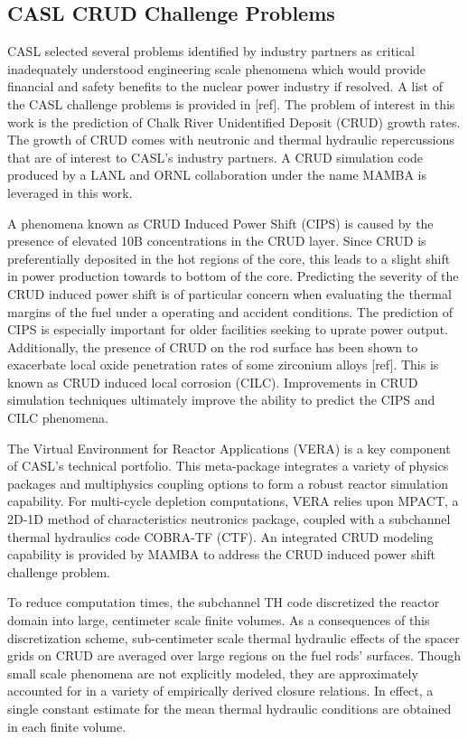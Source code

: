 \subsection{CASL CRUD Challenge Problems}

CASL selected several problems identified by industry partners as critical
inadequately understood engineering scale phenomena which would provide
financial and safety benefits to the nuclear power industry if resolved.  A
list of the CASL challenge problems is provided in [ref].  The problem of
interest in this work is the prediction of Chalk River Unidentified Deposit
(CRUD) growth rates.  The growth of CRUD comes with neutronic and thermal
hydraulic repercussions that are of interest to CASL's industry partners.
A CRUD simulation code produced by a LANL
and ORNL collaboration \cite{collins16} under the name MAMBA is leveraged in this work.

A phenomena known as CRUD Induced Power Shift (CIPS) is caused by the presence
of elevated 10B concentrations in the CRUD layer.  Since CRUD is preferentially
deposited in the hot regions of the core, this leads to a slight shift in
power production towards to bottom of the core.  Predicting the severity of the
CRUD induced power shift is of particular concern when evaluating the thermal
margins of the fuel under a operating and accident conditions.  The prediction
of CIPS is especially important for older facilities seeking to uprate power
output.  Additionally, the presence of CRUD on the rod surface has been shown
to exacerbate local oxide penetration rates of some zirconium alloys [ref].
This is known as CRUD induced local corrosion (CILC).  Improvements in CRUD
simulation techniques ultimately improve the ability to predict the CIPS and
CILC phenomena.

The Virtual Environment for Reactor Applications (VERA) is a key component of
CASL's technical portfolio.  This meta-package integrates a variety of physics
packages and multiphysics coupling options to form a robust reactor simulation
capability.  For multi-cycle depletion computations, VERA relies upon MPACT, a
2D-1D method of characteristics neutronics package, coupled with a subchannel
thermal hydraulics code COBRA-TF (CTF).  An integrated CRUD modeling capability
is provided by MAMBA to address the CRUD induced power shift challenge problem.

To reduce computation times, the subchannel TH code discretized the reactor
domain into large, centimeter scale finite volumes. As a consequences of this
discretization scheme, sub-centimeter scale thermal hydraulic effects of the
spacer grids on CRUD are averaged over large regions on the fuel rods'
surfaces.  Though small scale phenomena are not explicitly modeled, they are
approximately accounted for in a variety of empirically derived closure
relations.  In effect, a single constant estimate for the mean thermal
hydraulic conditions are obtained in each finite volume.

